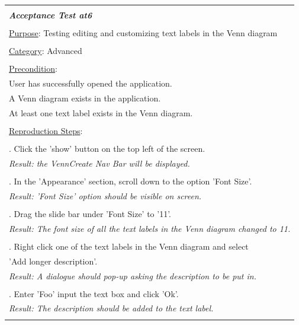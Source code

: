 \documentclass[fontsize=12pt,paper=letter,twoside]{scrartcl}
\begin{document}
\begin{table}[!h]
	\begin{tabular}{|l|}
		\hline
		\\
		\textbf{\emph{Acceptance Test at6}} 	
		\\\\
		\underline{Purpose}: Testing editing and customizing text labels in the Venn diagram \\
		\\
		\underline{Category}: Advanced		\\
		\\
		\underline{Precondition}:															\\ \qquad
		User has successfully opened the application.
		\\ \qquad
		A Venn diagram exists in the application.
		\\ \qquad
		At least one text label exists in the Venn diagram.
		\\\\
		\underline{Reproduction Steps}:				
		\\\\ \qquad 1. Click the 'show' button on the top left of the screen.
		\\ \qquad \textit{Result: the VennCreate Nav Bar will be displayed.} 
		\\\\ \qquad 2. In the 'Appearance' section, scroll down to the option 'Font Size'.
		\\ \qquad \textit{Result: 'Font Size' option should be visible on screen.} 
		\\\\ \qquad 3. Drag the slide bar under 'Font Size' to '11'.
		\\ \qquad \textit{Result: The font size of all the text labels in the Venn diagram changed to 11.} 
		\\\\ \qquad 4. Right click one of the text labels in the Venn diagram and select
		\\ \qquad \qquad 'Add longer description'.
		\\ \qquad \textit{Result: A dialogue should pop-up asking the description to be put in.} 
		\\\\ \qquad 5. Enter 'Foo' input the text box and click 'Ok'.
		\\ \qquad \textit{Result: The description should be added to the text label.} 
		\\\\
		\hline
	\end{tabular}
\end{table}
\end{document}
